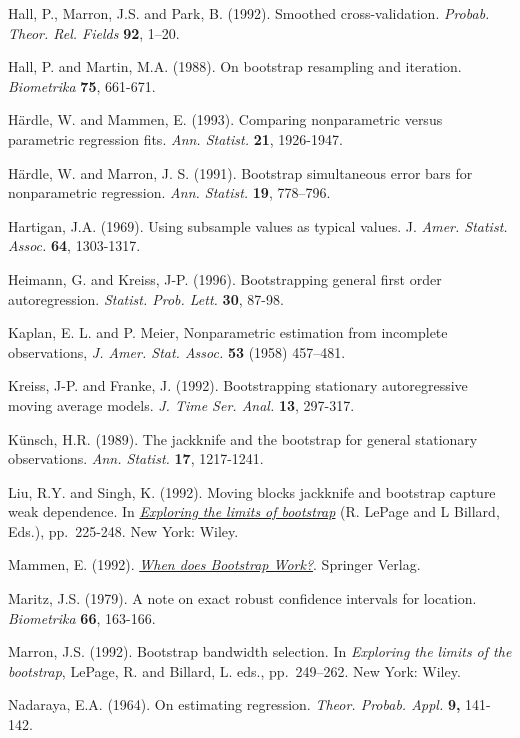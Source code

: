 \documentclass[]{book}
\theoremstyle{break}
\theoremstyle{definition}
\theoremstyle{definition}
\theoremstyle{definition}
\theoremstyle{remark}
\begin{document}
Hall, P., Marron, J.S. and Park, B. (1992). Smoothed cross-validation.
\emph{Probab. Theor. Rel. Fields} \textbf{92}, 1--20.

Hall, P. and Martin, M.A. (1988). On bootstrap resampling and iteration.
\emph{Biometrika} \textbf{75}, 661-671.

Härdle, W. and Mammen, E. (1993). Comparing nonparametric versus
parametric regression fits. \emph{Ann. Statist.} \textbf{21}, 1926-1947.

Härdle, W. and Marron, J. S. (1991). Bootstrap simultaneous error bars
for nonparametric regression. \emph{Ann. Statist.} \textbf{19},
778--796.

Hartigan, J.A. (1969). Using subsample values as typical values. J.
\emph{Amer. Statist. Assoc.} \textbf{64}, 1303-1317.

Heimann, G. and Kreiss, J-P. (1996). Bootstrapping general first order
autoregression. \emph{Statist. Prob. Lett.} \textbf{30}, 87-98.

Kaplan, E. L. and P. Meier, Nonparametric estimation from incomplete
observations, \emph{J. Amer. Stat. Assoc.} \textbf{53} (1958) 457--481.

Kreiss, J-P. and Franke, J. (1992). Bootstrapping stationary
autoregressive moving average models. \emph{J. Time Ser. Anal.}
\textbf{13}, 297-317.

Künsch, H.R. (1989). The jackknife and the bootstrap for general
stationary observations. \emph{Ann. Statist.} \textbf{17}, 1217-1241.

Liu, R.Y. and Singh, K. (1992). Moving blocks jackknife and bootstrap
capture weak dependence. In
\href{https://books.google.es/books?hl=es\&lr=\&id=ZJzIpNZNVLgC\&oi=fnd\&pg=PA3\&dq=Exploring+the+limits+of+the+bootstrap}{\emph{Exploring
the limits of bootstrap}} (R. LePage and L Billard, Eds.), pp.~225-248.
New York: Wiley.

Mammen, E. (1992).
\href{https://books.google.es/books?hl=es\&lr=\&id=zpDfBwAAQBAJ\&oi=fnd\&pg=PP8\&dq=When+does+Bootstrap+Work\%3F}{\emph{When
does Bootstrap Work?}}. Springer Verlag.

Maritz, J.S. (1979). A note on exact robust confidence intervals for
location. \emph{Biometrika} \textbf{66}, 163-166.

Marron, J.S. (1992). Bootstrap bandwidth selection. In \emph{Exploring
the limits of the bootstrap}, LePage, R. and Billard, L. eds.,
pp.~249--262. New York: Wiley.

Nadaraya, E.A. (1964). On estimating regression. \emph{Theor. Probab.
Appl.} \textbf{9,} 141-142.
\end{document}
